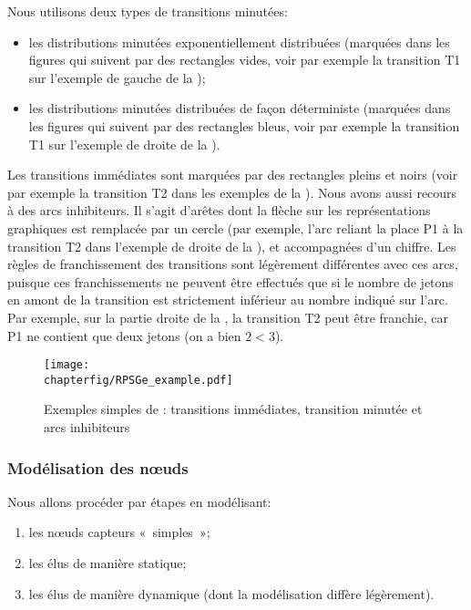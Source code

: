 Nous utilisons deux types de transitions minutées:
\begin{itemize}
    \item les distributions minutées exponentiellement distribuées (marquées dans les figures qui suivent par des rectangles vides, voir par exemple la transition \textsf{T1} sur l'exemple de gauche de la );
    \item les distributions minutées distribuées de façon déterministe (marquées dans les figures qui suivent par des rectangles bleus, voir par exemple la transition \textsf{T1} sur l'exemple de droite de la ).
\end{itemize}
Les transitions immédiates sont marquées par des rectangles pleins et noirs (voir par exemple la transition \textsf{T2} dans les exemples de la ).
Nous avons aussi recours à des arcs inhibiteurs.
Il s'agit d'arêtes dont la flèche sur les représentations graphiques est remplacée par un cercle (par exemple, l'arc reliant la place \textsf{P1} à la transition \textsf{T2} dans l'exemple de droite de la ), et accompagnées d'un chiffre.
Les règles de franchissement des transitions sont légèrement différentes avec ces arcs, puisque ces franchissements ne peuvent être effectués que si le nombre de jetons en amont de la transition est strictement inférieur au nombre indiqué sur l'arc.
Par exemple, sur la partie droite de la , la transition \textsf{T2} peut être franchie, car \textsf{P1} ne contient que deux jetons (on a bien $2<3$).
\begin{figure}[ht]
    \centering
    \texttt{[image: \\chapterfig/RPSGe\_example.pdf]}
    \caption{Exemples simples de \rpsge: transitions immédiates, transition minutée et arcs inhibiteurs}\label{sa:fig:gspnex1}
\end{figure}

        \subsubsection{Modélisation des nœuds}
Nous allons procéder par étapes en modélisant:
\begin{enumerate}
    \item les nœuds capteurs «~simples~»;
    \item les \cns élus de manière statique;
    \item les \cns élus de manière dynamique (dont la modélisation diffère légèrement).
\end{enumerate}

